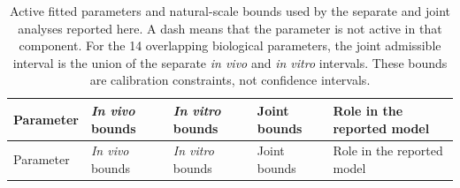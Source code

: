 \begingroup
\scriptsize
\setlength{\tabcolsep}{3pt}
\setlength\LTleft{0pt}
\setlength\LTright{0pt}
\begin{longtable}{@{}p{}p{}p{}p{}p{}@{}}
\caption{Active fitted parameters and natural-scale bounds used by the separate and joint analyses reported here. A dash means that the parameter is not active in that component. For the 14 overlapping biological parameters, the joint admissible interval is the union of the separate \textit{in vivo} and \textit{in vitro} intervals. These bounds are calibration constraints, not confidence intervals.}
\label{tab:tao_model_parameters}\\

\toprule
Parameter & \textit{In vivo} bounds & \textit{In vitro} bounds & Joint bounds & Role in the reported model \\
\midrule
\endfirsthead

\toprule
Parameter & \textit{In vivo} bounds & \textit{In vitro} bounds & Joint bounds & Role in the reported model \\
\midrule
\endhead


\end{longtable}

